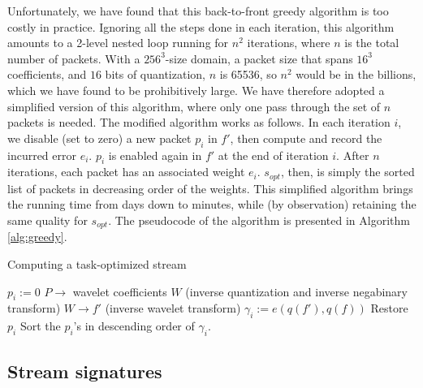 Unfortunately, we have found that this back-to-front greedy algorithm is too costly in practice.
Ignoring all the steps done in each iteration, this algorithm amounts to a 2-level nested loop
running for $n^2$ iterations, where $n$ is the total number of packets. With a $256^3$-size domain,
a packet size that spans $16^3$ coefficients, and $16$ bits of quantization, $n$ is 65536, so $n^2$
would be in the billions, which we have found to be prohibitively large. We have therefore adopted a
simplified version of this algorithm, where only one pass through the set of $n$ packets is needed.
The modified algorithm works as follows. In each iteration $i$, we disable (set to zero) a new
packet $p_i$ in $f'$, then compute and record the incurred error $e_i$. $p_i$ is enabled again in
$f'$ at the end of iteration $i$. After $n$ iterations, each packet has an associated weight $e_i$.
$s_{opt}$, then, is simply the sorted list of packets in decreasing order of the weights. This
simplified algorithm brings the running time from days down to minutes, while (by observation)
retaining the same quality for $s_{opt}$. The pseudocode of the algorithm is presented in Algorithm
\autoref{alg:greedy}.

\begin{algorithm}[h]
  \small
  \caption{Computing a task-optimized stream}
  \begin{algorithmic}[1]
			\State $p_i := 0$
      \State $P \rightarrow$ wavelet coefficients $W$ (inverse quantization and inverse negabinary transform)
			\State $W \rightarrow f'$ (inverse wavelet transform)
			\State $\gamma_i := e(q(f'),q(f))$			
			\State Restore $p_i$
		\EndFor
		\State Sort the $p_i$'s in descending order of $\gamma_i$.
	\end{algorithmic}
	\label{alg:greedy}
\end{algorithm}

\subsection{Stream signatures}\label{sec:stream-signature}

